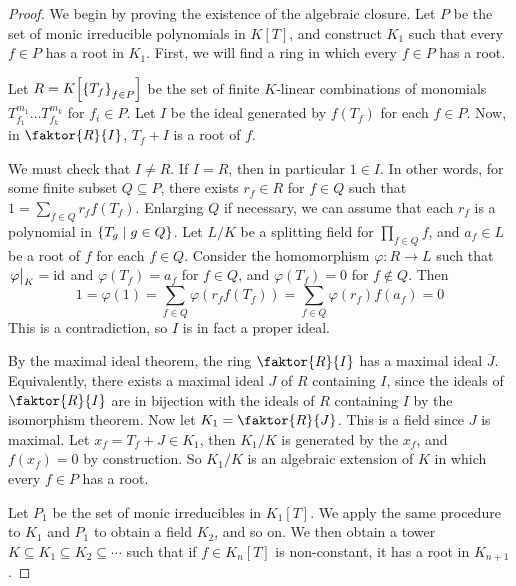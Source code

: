 \begin{proof}
	We begin by proving the existence of the algebraic closure.
	Let \( P \) be the set of monic irreducible polynomials in \( K[T] \), and construct \( K_1 \) such that every \( f \in P \) has a root in \( K_1 \).
	First, we will find a ring in which every \( f \in P \) has a root.

	Let \( R = K\qty[\qty{T_f}_{f \in P}] \) be the set of finite \( K \)-linear combinations of monomials \( T_{f_1}^{m_1} \dots T_{f_k}^{m_k} \) for \( f_i \in P \).
	Let \( I \) be the ideal generated by \( f(T_f) \) for each \( f \in P \).
	Now, in \( \faktor{R}{I} \), \( T_f + I \) is a root of \( f \).

	We must check that \( I \neq R \).
	If \( I = R \), then in particular \( 1 \in I \).
	In other words, for some finite subset \( Q \subseteq P \), there exists \( r_f \in R \) for \( f \in Q \) such that \( 1 = \sum_{f \in Q} r_f f(T_f) \).
	Enlarging \( Q \) if necessary, we can assume that each \( r_f \) is a polynomial in \( \qty{T_g \mid g \in Q} \).
	Let \( L / K \) be a splitting field for \( \prod_{f \in Q} f \), and \( a_f \in L \) be a root of \( f \) for each \( f \in Q \).
	Consider the homomorphism \( \varphi \colon R \to L \) such that \( \eval{\varphi}_K = \mathrm{id} \) and \( \varphi(T_f) = a_f \) for \( f \in Q \), and \( \varphi(T_f) = 0 \) for \( f \not\in Q \).
	Then
	\[ 1 = \varphi(1) = \sum_{f \in Q} \varphi(r_f f(T_f)) = \sum_{f \in Q} \varphi(r_f) f(a_f) = 0 \]
	This is a contradiction, so \( I \) is in fact a proper ideal.

	By the maximal ideal theorem, the ring \( \faktor{R}{I} \) has a maximal ideal \( \overline J \).
	Equivalently, there exists a maximal ideal \( J \) of \( R \) containing \( I \), since the ideals of \( \faktor{R}{I} \) are in bijection with the ideals of \( R \) containing \( I \) by the isomorphism theorem.
	Now let \( K_1 = \faktor{R}{J} \).
	This is a field since \( J \) is maximal.
	Let \( x_f = T_f + J \in K_1 \), then \( K_1 / K \) is generated by the \( x_f \), and \( f(x_f) = 0 \) by construction.
	So \( K_1 / K \) is an algebraic extension of \( K \) in which every \( f \in P \) has a root.

	Let \( P_1 \) be the set of monic irreducibles in \( K_1[T] \).
	We apply the same procedure to \( K_1 \) and \( P_1 \) to obtain a field \( K_2 \), and so on.
	We then obtain a tower \( K \subseteq K_1 \subseteq K_2 \subseteq \cdots \) such that if \( f \in K_n[T] \) is non-constant, it has a root in \( K_{n+1} \).


\end{proof}
